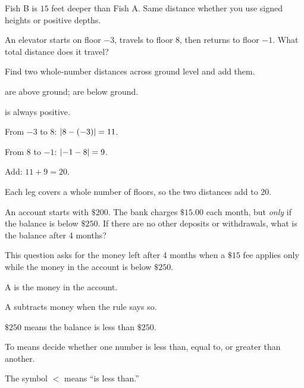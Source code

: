 
Fish B is $15$ feet deeper than Fish A. Same distance whether you use signed heights or positive depths.


An elevator starts on floor $-3$, travels to floor $8$, then returns to floor $-1$. What total distance does it travel?


Find two whole-number distances across ground level and add them.

\begin{words}
  \item {}are above ground; are below ground.
  \item {}is always positive.
\end{words}

\begin{steps}
  \item From $-3$ to $8$: $\left\lvert 8-(-3) \right\rvert = 11$.
  \item From $8$ to $-1$: $\left\lvert -1-8 \right\rvert = 9$.
  \item Add: $11 + 9 = 20$.
\end{steps}


Each leg covers a whole number of floors, so the two distances add to $20$.



An account starts with $\$200$. The bank charges $\$15.00$ each month, but \emph{only} if the balance is below $\$250$. If there are no other deposits or withdrawals, what is the balance after 4 months?


This question asks for the money left after 4 months when a $\$15$ fee applies only while the money in the account is below $\$250$.

\begin{words}
  \item A is the money in the account.
  \item A subtracts money when the rule says so.
  \item {}$\$250$ means the balance is less than $\$250$.
  \item To means decide whether one number is less than, equal to, or greater than another.
  \item The symbol $<$ means ``is less than.''
\end{words}

